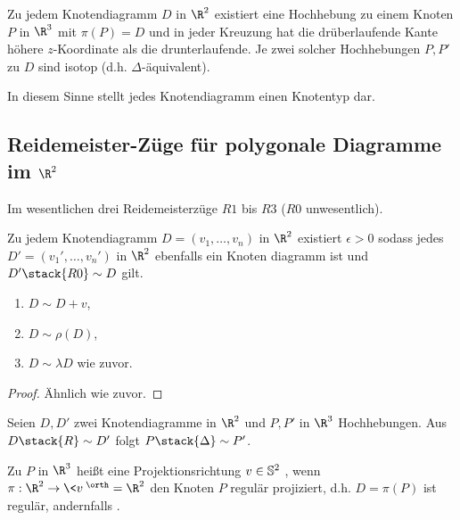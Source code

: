 \begin{lem}
    Zu jedem Knotendiagramm $D$ in $\R^2$ existiert eine Hochhebung zu einem Knoten $P$ in $\R^3$ mit $\pi(P) = D$ und in jeder Kreuzung hat die drüberlaufende Kante höhere $z$-Koordinate als die drunterlaufende.
    Je zwei solcher Hochhebungen $P, P'$ zu $D$ sind isotop (d.h. $\Delta$-äquivalent).
\end{lem}

In diesem Sinne stellt jedes Knotendiagramm einen Knotentyp dar.


\subsection{Reidemeister-Züge für polygonale Diagramme im \texorpdfstring{$\R^2$}{ℝ²}}


Im wesentlichen drei Reidemeisterzüge $R1$ bis $R3$ ($R0$ unwesentlich).

\begin{lem}
    Zu jedem Knotendiagramm $D = (v_1, \dotsc, v_n)$ in $\R^2$ existiert $\epsilon > 0$ sodass jedes $D' = (v_1', \dotsc, v_n')$ in $\R^2$ ebenfalls ein Knoten diagramm ist und $D' \stack{R0}\sim D$ gilt.
    \begin{enumerate}[(1)]
        \item
            $D \sim D + v$,
        \item
            $D \sim \rho(D)$,
        \item
            $D \sim \lambda D$ wie zuvor.
    \end{enumerate}
    \begin{proof}
        Ähnlich wie zuvor.
    \end{proof}
\end{lem}

\begin{lem}
    Seien $D, D'$ zwei Knotendiagramme in $\R^2$ und $P, P'$ in $\R^3$ Hochhebungen.
    Aus $D \stack{R}\sim D'$ folgt $P \stack{\Delta}\sim P'$.
\end{lem}

\begin{df}
    Zu $P$ in $\R^3$ heißt eine Projektionsrichtung $v \in \S^2$ , wenn $\pi: \R^2 \to \<v\>^\orth \homeomorphic \R^2$ den Knoten $P$ regulär projiziert, d.h. $D = \pi(P)$ ist regulär, andernfalls .
\end{df}

